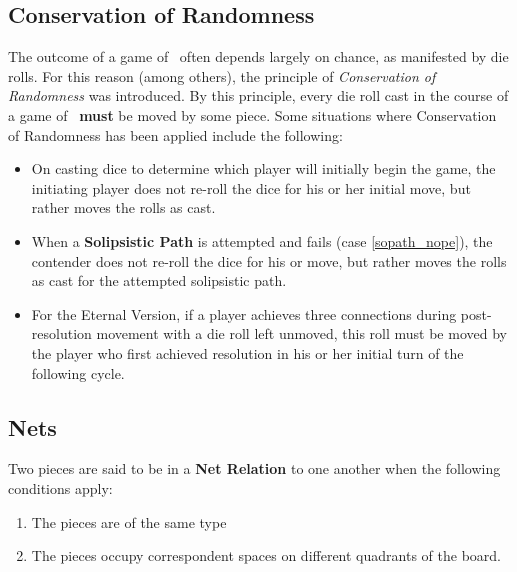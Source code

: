 %
\subsection{Conservation of Randomness}\label{conserve}
  The outcome of a game of \know\ often depends largely on chance,
  as manifested by die rolls.  For this reason (among others), the
  principle of {\sl Conservation of Randomness} was introduced.
  By this principle, every die roll cast in the course of a game
  of \know\ {\bf must} be moved by some piece.  Some situations
  where Conservation of Randomness has been applied include
  the following:
  \begin{itemize}
    \item
      On casting dice to determine which player will initially
      begin the game, the initiating player does not re-roll
      the dice for his or her initial move, but rather moves the
      rolls as cast.

    \item
      When a {\bf Solipsistic Path} is attempted and fails
      (case \ref{sopath_nope}), the contender does not re-roll
      the dice for his or move, but rather moves the rolls as
      cast for the attempted solipsistic path.

    \item
      For the Eternal Version, if a player achieves three connections
      during post-resolution movement with a die roll left unmoved,
      this roll must be moved by the player who first achieved
      resolution in his or her initial turn of the following cycle.
  \end{itemize}

\subsection{Nets}\label{nets}
  Two pieces are said to be in a {\bf Net Relation} to one another
  when the following conditions apply:
  \begin{enumerate}
    \item The pieces are of the same type
    \item The pieces occupy correspondent spaces on different quadrants of the board.
  \end{enumerate}

